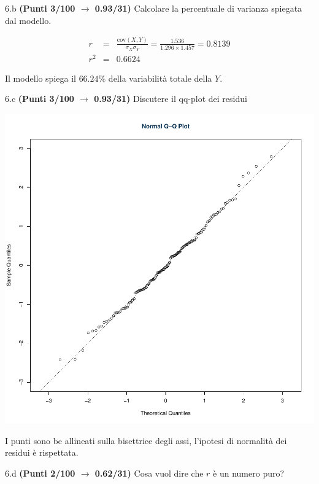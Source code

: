 \documentclass[
  11pt,
]{book}
\theoremstyle{mytheoremstyle}
\theoremstyle{mydefstyle}
\newenvironment{sol}
  {
  \begin{tcolorbox}[enhanced,breakable,arc=0.1mm,boxrule=1pt,colback=white,colframe=iblue,
  title=\bf \fontfamily{lmss}\selectfont \hspace{.5 cm} Soluzione,drop fuzzy shadow]

}{
\end{tcolorbox}
  }
\begin{document}
6.b \textbf{(Punti 3/100 \(\rightarrow\) 0.93/31)} Calcolare la percentuale di varianza spiegata dal modello.

\begin{sol}
\begin{eqnarray*}
r&=&\frac{\text{cov}(X,Y)}{\sigma_X\sigma_Y}=\frac{ 1.536 }{ 1.296 \times 1.457 }= 0.8139 \\ 
r^2&=& 0.6624\end{eqnarray*}

Il modello spiega il \(66.24\%\) della variabilità totale della \(Y\).

\end{sol}

6.c \textbf{(Punti 3/100 \(\rightarrow\) 0.93/31)} Discutere il qq-plot dei residui

\begin{center}\includegraphics{Esami_passati_con_soluzioni_files/figure-latex/2021-7,-1} \end{center}

\begin{sol}
I punti sono be allineati sulla bisettrice degli assi, l'ipotesi di normalità dei residui è rispettata.

\end{sol}

6.d \textbf{(Punti 2/100 \(\rightarrow\) 0.62/31)} Cosa vuol dire che \(r\) è un numero puro?
\end{document}
